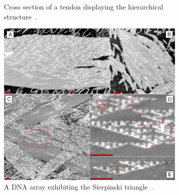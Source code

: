 \begin{figure}
\begin{subfigure}{.40\linewidth}
  \caption{Cross section of a tendon displaying the hierarchical structure~\cite{lecture_biosolid_mechanics}.}
  \label{fig:material_examples:tendon}
\end{subfigure}\hfill
\begin{subfigure}{.30\linewidth}\centering
  \includegraphics[width=\linewidth]{img/Rothemund-DNA-SierpinskiGasket}
  \caption{A DNA array exhibiting the Sierpinski triangle~\cite{wikimediacommons2007dna}.}
  \label{fig:material_examples:sierpinski}
\end{subfigure}
\caption{}\label{fig:material_examples}
\end{figure}


